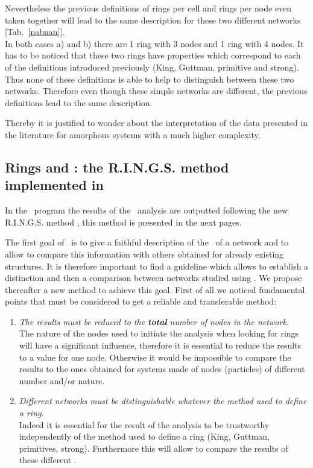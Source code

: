 Nevertheless the previous definitions of rings per cell and rings per node even taken together will lead to the same description for these two different networks [Tab.~\ref{nabnan}]. 
\nabnantab
\\ In both cases a) and b) there are 1 ring with 3 nodes and 1 ring with 4 nodes. 
It has to be noticed that these two rings have properties which correspond to each of the definitions introduced previously (King, Guttman, primitive and strong). \\
Thus none of these definitions is able to help to distinguish between these two networks. 
Therefore even though these simple networks are different, the previous definitions lead to the same description. \\
\par
\noindent Thereby it is justified to wonder about the interpretation of the data presented in the literature for amorphous systems with a much higher complexity. 

\subsection{Rings and \con: the R.I.N.G.S. method implemented in \atomes}

In the \atomes\ program the results of the \rstat\ analysis are outputted following the new R.I.N.G.S. method \cite{RINGS, RINGS2}, this method is presented in the next pages. \\
\par The first goal of \rstat\ is to give a faithful description of the \con\ of a network and to allow to compare this information with others obtained for already existing structures. 
It is therefore important to find a guideline which allows to establish a distinction and then a comparison between networks studied using \rstat. 
We propose thereafter a new method to achieve this goal. 
First of all we noticed fundamental points that must be considered to get a reliable and transferable method:\\
\begin{enumerate}
\item \label{Pr1} {\em The results must be reduced to the {\bf{total}} number of nodes in the network.} \\
\noindent The nature of the nodes used to initiate the analysis when looking for rings will have a significant influence, therefore it is essential to reduce the results to a value for one node. 
Otherwise it would be impossible to compare the results to the ones obtained for systems made of nodes (particles) of different number and/or nature. \\
\item \label{Pr2} {\em Different networks must be distinguishable whatever the method used to define a ring.} \\
Indeed it is essential for the result of the analysis to be trustworthy independently of the method used to define a ring (King, Guttman, primitives, strong). 
Furthermore this will allow to compare the results of these different \rstat. 
\end{enumerate}


